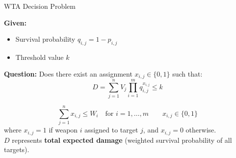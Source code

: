 \documentclass[aspectratio=169,10pt]{beamer}
\begin{document}
\begin{frame}{WTA Decision Problem}


  \vspace{0.2cm}
  {\footnotesize
  \textbf{Given:}
  \begin{itemize}
    \setlength\itemsep{2pt}
    \item[\color{goldaccent}$\blacktriangleright$] Survival probability $q_{i,j} = 1 - p_{i,j}$
    \item[\color{goldaccent}$\blacktriangleright$] Threshold value $k$
  \end{itemize}
  \textbf{Question:} Does there exist an assignment $x_{i,j} \in \{0,1\}$ such that:
  \[
    D = \sum_{j=1}^{n} V_j \prod_{i=1}^{m} q_{i,j}^{x_{i,j}} \leq k
  \]
  }

  \vspace{0.2cm}


  \vspace{0.2cm}
  {\footnotesize
  \[
    \sum_{j=1}^{n} x_{i,j} \leq W_i \quad \text{for } i = 1,\ldots,m
    \qquad x_{i,j} \in \{0,1\}
  \]
  where $x_{i,j} = 1$ if weapon $i$ assigned to target $j$, and $x_{i,j} = 0$ otherwise.\\[3pt]
  $D$ represents \textbf{total expected damage} (weighted survival probability of all targets).
  }

\end{frame}
\end{document}
